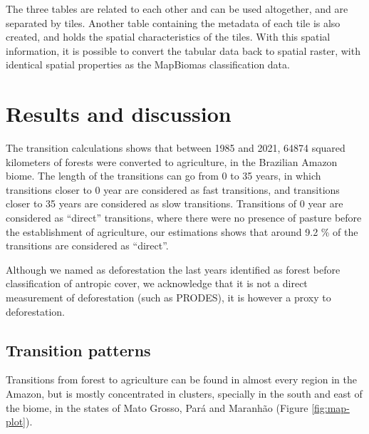 \documentclass[essd, manuscript]{copernicus}
\begin{document}
The three tables are related to each other and can be used altogether, and are separated by tiles.
Another table containing the metadata of each tile is also created, and holds the spatial characteristics of the tiles.
With this spatial information, it is possible to convert the tabular data back to spatial raster, with identical spatial properties as the MapBiomas classification data.

\section{Results and discussion}

The transition calculations shows that between 1985 and 2021, 64874 squared kilometers of forests were converted to agriculture, in the Brazilian Amazon biome.
The length of the transitions can go from 0 to 35 years, in which transitions closer to 0 year are considered as fast transitions, and transitions closer to 35 years are considered as slow transitions.
Transitions of 0 year are considered as ``direct'' transitions, where there were no presence of pasture before the establishment of agriculture, our estimations shows that around 9.2 \% of the transitions are considered as ``direct''.

Although we named as deforestation the last years identified as forest before classification of antropic cover, we acknowledge that it is not a direct measurement of deforestation (such as PRODES), it is however a proxy to deforestation.

\subsection{Transition patterns}

Transitions from forest to agriculture can be found in almost every region in the Amazon, but is mostly concentrated in clusters, specially in the south and east of the biome, in the states of Mato Grosso, Pará and Maranhão (Figure \ref{fig:map-plot}).
\end{document}
